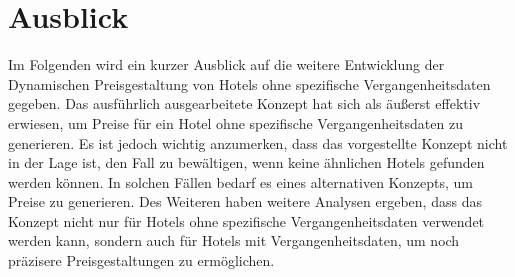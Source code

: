 \chapter{Ausblick}
\label{chap:ausblick}
Im Folgenden wird ein kurzer Ausblick auf die weitere Entwicklung der Dynamischen Preisgestaltung von Hotels ohne spezifische Vergangenheitsdaten gegeben. Das ausführlich ausgearbeitete Konzept hat sich als äußerst effektiv erwiesen, um Preise für ein Hotel ohne spezifische Vergangenheitsdaten zu generieren.
\newline
\newline
Es ist jedoch wichtig anzumerken, dass das vorgestellte Konzept nicht in der Lage ist, den Fall zu bewältigen, wenn keine ähnlichen Hotels gefunden werden können. In solchen Fällen bedarf es eines alternativen Konzepts, um Preise zu generieren.
\newline
\newline
Des Weiteren haben weitere Analysen ergeben, dass das Konzept nicht nur für Hotels ohne spezifische Vergangenheitsdaten verwendet werden kann, sondern auch für Hotels mit Vergangenheitsdaten, um noch präzisere Preisgestaltungen zu ermöglichen.